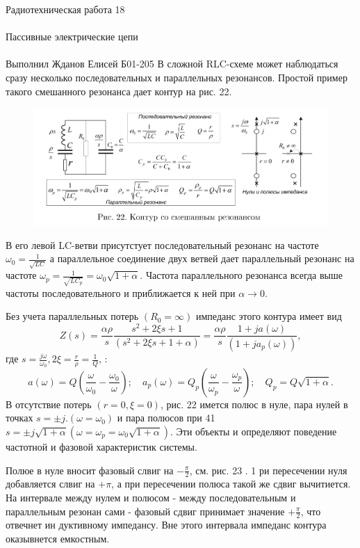 \documentclass{astroedu-lab}
\begin{document}
\begin{problem}{\huge Радиотехническая работа 18\\\\Пассивные электрические цепи\\\\Выполнил Жданов Елисей Б01-205}
В сложной RLC-схеме может наблюдаться сразу несколько
последовательных и параллельных резонансов. Простой пример
такого смешанного резонанса дает контур на рис. 22.

\begin{figure}[!h]
	\centering
	\includegraphics[width=1\textwidth]{6_1.png}
	\label{fig:boiler}
\end{figure}

В его левой LC-ветви присутстует последовательный резонанс на частоте $\omega_0=\frac{1}{\sqrt{L C}}$ а параллельное соединение двух ветвей дает параллельный резонанс на частоте $\omega_p=\frac{1}{\sqrt{L C_p}}=\omega_0 \sqrt{1+\alpha}$. Частота параллельного резонанса всегда выше частоты последовательного и приближается к ней при $\alpha \rightarrow 0$.

Без учета параллельных потерь $\left(R_0=\infty\right)$ импеданс этого контура имеет вид
$$
Z(s)=\frac{\alpha \rho}{s} \frac{s^2+2 \xi s+1}{\left(s^2+2 \xi s+1+\alpha\right)}=\frac{\alpha \rho}{s} \frac{1+j a(\omega)}{\left(1+j a_p(\omega)\right)},
$$
где $s=\frac{j \omega}{\omega_0}, 2 \xi=\frac{r}{\rho}=\frac{1}{Q}$, :
$$
a(\omega)=Q\left(\frac{\omega}{\omega_0}-\frac{\omega_0}{\omega}\right) ; \quad a_p(\omega)=Q_p\left(\frac{\omega}{\omega_p}-\frac{\omega_p}{\omega}\right) ; \quad Q_p=Q \sqrt{1+\alpha} .
$$
В отсутствие потерь $(r=0, \xi=0)$, рис. 22 имется полюс в нуле, пара нулей в точках $s= \pm j .\left(\omega=\omega_0\right)$ и пара полюсов при
41
$s= \pm j \sqrt{1+\alpha}\left(\omega=\omega_p=\omega_0 \sqrt{1+\alpha}\right)$. Эти объекты и определяют поведение частотной и фазовой характеристик системы.

Полюе в нуле вносит фазовый слвиг на $-\frac{\pi}{2}$, см. рис. 23 . 1 ри пересечении нуля добавляется слвиг на $+\pi$, а при пересечении полюса такой же сдвиг вычитиется. На интервале между нулем и полюсом - между последовательным и параллельным резонан сами - фазовый сдвиг принимает значение $+\frac{\pi}{2}$, что отвечнет ин дуктивному импедансу. Вне этого интервала импеданс контура оказывнется емкостным.


\end{problem}
\end{document}

